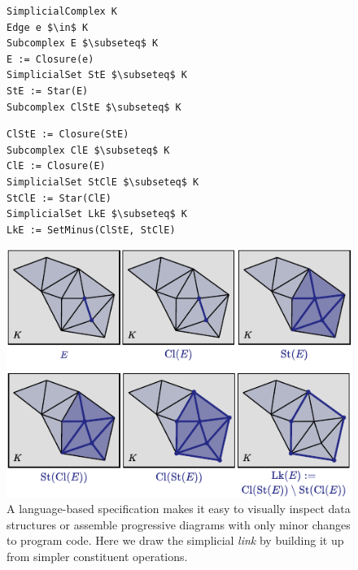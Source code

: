 \begin{figure}
\begin{mdframed}[style=SUBCode]
\begin{minipage}[t]{.47\columnwidth}
\begin{lstlisting}[language=Sub-mesh,escapechar=@,numbers=none]
SimplicialComplex K
Edge e $\in$ K
Subcomplex E $\subseteq$ K
E := Closure(e)
SimplicialSet StE $\subseteq$ K
StE := Star(E)
Subcomplex ClStE $\subseteq$ K
\end{lstlisting}
\end{minipage}
\ContinueLineNumber
\begin{minipage}[t]{.5\columnwidth}
\begin{lstlisting}[language=Sub-mesh,escapechar=@,numbers=none]
ClStE := Closure(StE)
Subcomplex ClE $\subseteq$ K
ClE := Closure(E)
SimplicialSet StClE $\subseteq$ K
StClE := Star(ClE)
SimplicialSet LkE $\subseteq$ K
LkE := SetMinus(ClStE, StClE)\end{lstlisting}
\end{minipage}
\end{mdframed}
   \centering
   \includegraphics{assets/penrose/mesh-figure.pdf}
   \caption{A language-based specification makes it easy to visually inspect data structures or assemble progressive diagrams with only minor changes to program code.  Here we draw the simplicial \emph{link} by building it up from simpler constituent operations.\label{fig:substance-mesh-clst}}
\end{figure}

